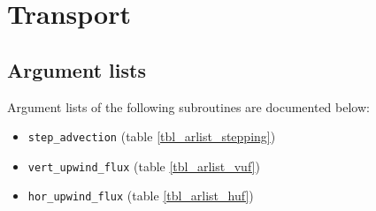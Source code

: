 %

\chapter{Transport}
\section{Argument lists}
Argument lists of the following subroutines are documented below:
\begin{itemize}
\item \lstinline!step_advection! (table \ref{tbl_arlist_stepping})
\item \lstinline!vert_upwind_flux! (table \ref{tbl_arlist_vuf})
\item \lstinline!hor_upwind_flux! (table \ref{tbl_arlist_huf})
\end{itemize}


